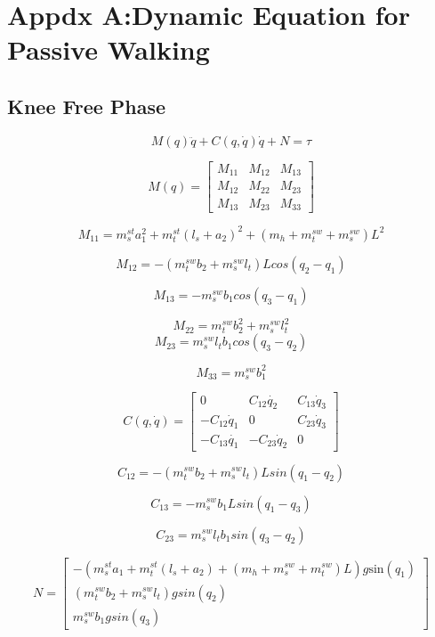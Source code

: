 \chapter{Appdx A:Dynamic Equation for Passive Walking}

\section{Knee Free Phase}

\[
M(q)\ddot{q}+C(q,\dot{q})\dot{q}+N=\tau\]


\[
M(q)=\left[\begin{array}{ccc}
M_{11} & M_{12} & M_{13}\\
M_{12} & M_{22} & M_{23}\\
M_{13} & M_{23} & M_{33}\end{array}\right]
\]

\[
M_{11}=m_{s}^{st}a_{1}^{2}+m_{t}^{st}(l_{s}+a_{2})^{2}+(m_{h}+m_{t}^{sw}+m_{s}^{sw})L^{2}\]


\[
M_{12}=-(m_{t}^{sw}b_{2}+m_{s}^{sw}l_{t})Lcos(q_{2}-q_{1})\]


\[
M_{13}=-m_{s}^{sw}b_{1}cos(q_{3}-q_{1})\]


\[
M_{22}=m_{t}^{sw}b_{2}^{2}+m_{s}^{sw}l_{t}^{2}\]
\[
M_{23}=m_{s}^{sw}l_{t}b_{1}cos(q_{3}-q_{2})\]


\[
M_{33}=m_{s}^{sw}b_{1}^{2}\]


\[
C(q,\dot{q})=\left[\begin{array}{ccc}
0 & C_{12}\dot{q_{2}} & C_{13}\dot{q}_{3}\\
-C_{12}\dot{q}_{1} & 0 & C_{23}\dot{q}_{3}\\
-C_{13}\dot{q_{1}} & -C_{23}\dot{q}_{2} & 0\end{array}\right]\]


\[
C_{12}=-(m_{t}^{sw}b_{2}+m_{s}^{sw}l_{t})Lsin(q_{1}-q_{2})\]


\[
C_{13}=-m_{s}^{sw}b_{1}Lsin(q_{1}-q_{3})\]


\[
C_{23}=m_{s}^{sw}l_{t}b_{1}sin(q_{3}-q_{2})\]



\[
N=\left[\begin{array}{c}
-(m_{s}^{st}a_{1}+m_{t}^{st}(l_{s}+a_{2})+(m_{h}+m_{s}^{sw}+m_{t}^{sw})L)g\mathbf{\mathrm{sin}}(q_{1})\\
(m_{t}^{sw}b_{2}+m_{s}^{sw}l_{t})gsin(q_{2})\\
m_{s}^{sw}b_{1}gsin(q_{3})\end{array}\right]\]


